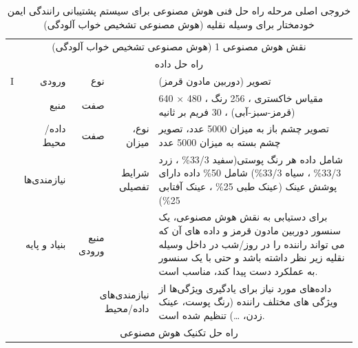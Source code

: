 \documentclass[a4paper,10pt]{article}
\begin{document}
            \begin{table}[htbp]

                \centering
                \caption{خروجی اصلی مرحله راه حل فنی هوش مصنوعی برای سیستم پشتیبانی رانندگی ایمن خودمختار برای وسیله نقلیه (هوش مصنوعی تشخیص خواب آلودگی)}
                \begin{tabularx}{\textwidth}{c c c c X}

                    \vspace{-10pt}\\

                    \hline

                    \multicolumn{5}{c}{نقش هوش مصنوعی 1 (هوش مصنوعی تشخیص خواب آلودگی)}\\
                    
                    \hline

                    \multicolumn{5}{c}{راه حل داده}\\

                    \multicolumn{1}{c}{I} & \multicolumn{1}{r}{ورودی} & \multicolumn{1}{r}{نوع} &  & تصویر (دوربین مادون قرمز) \\
                    & \multicolumn{1}{r}{منبع} & \multicolumn{1}{r}{صفت} &  & 640 $\times$ 480 ، مقیاس خاکستری ، 256 رنگ (قرمز-سبز-آبی) ، 30 فریم بر ثانیه \\
                    & \multicolumn{1}{r}{داده/محیط} & \multicolumn{1}{r}{صفت} & \multicolumn{1}{r}{نوع، میزان} & تصویر چشم باز به میزان 5000 عدد، تصویر چشم بسته به میزان 5000 عدد \\
                    & \multicolumn{1}{r}{نیازمندی‌ها} &  & \multicolumn{1}{r}{شرایط تفصیلی} & شامل داده هر رنگ پوستی(سفید 33/3\% ، زرد 33/3\% ، سیاه 33/3\%) شامل 50\% داده دارای پوشش عینک (عینک طبی 25\% ، عینک آفتابی 25\%) \\
                    & \multicolumn{1}{r}{بنیاد و پایه} & \multicolumn{1}{r}{منبع ورودی} &  & برای دستیابی به نقش هوش مصنوعی، یک سنسور دوربین مادون قرمز و داده های آن که می تواند راننده را در روز/شب در داخل وسیله نقلیه زیر نظر داشته باشد و حتی با یک سنسور به عملکرد دست پیدا کند، مناسب است. \\
                    &  & \multicolumn{2}{r}{نیازمندی‌های داده/محیط} & داده‌های مورد نیاز برای یادگیری ویژگی‌ها از ویژگی های مختلف راننده (رنگ پوست، عینک زدن، \dots) تنظیم شده است. \\

                    \multicolumn{5}{c}{راه حل تکنیک هوش مصنوعی}\\


\end{tabularx}
\end{table}
\end{document}

